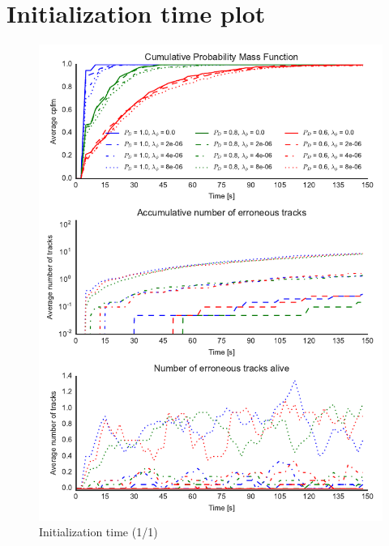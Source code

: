
\chapter{Initialization time plot}

\begin{figure}[H]
\centering
\includegraphics{Figures/plots/Scenario1_Init-Time(1-1).pdf}
\caption{Initialization time (1/1)}\label{fig:init_time_1-1}
\end{figure}

